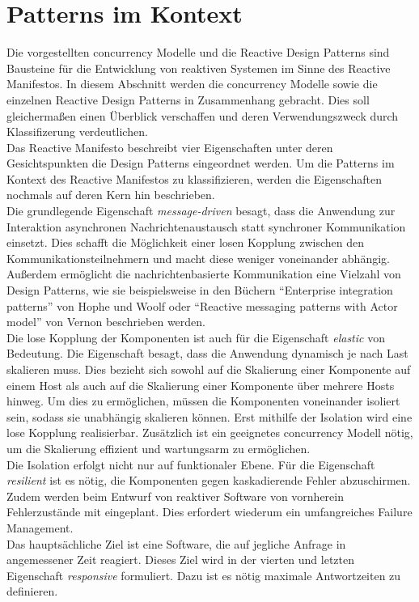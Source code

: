 \section{Patterns im Kontext}

Die vorgestellten \gls{concurrency} Modelle und die Reactive Design Patterns sind Bausteine für die Entwicklung von reaktiven Systemen im Sinne des Reactive Manifestos. In diesem Abschnitt werden die \gls{concurrency} Modelle sowie die einzelnen Reactive Design Patterns in Zusammenhang gebracht. Dies soll gleichermaßen einen Überblick verschaffen und deren Verwendungszweck durch Klassifizerung verdeutlichen.\\
Das Reactive Manifesto beschreibt vier Eigenschaften unter deren Gesichtspunkten die Design Patterns eingeordnet werden. Um die Patterns im Kontext des Reactive Manifestos zu klassifizieren, werden die Eigenschaften nochmals auf deren Kern hin beschrieben.\\

Die grundlegende Eigenschaft \textit{message-driven} besagt, dass die Anwendung zur Interaktion asynchronen Nachrichtenaustausch statt synchroner Kommunikation einsetzt. Dies schafft die Möglichkeit einer losen Kopplung zwischen den Kommunikationsteilnehmern und macht diese weniger voneinander abhängig. Außerdem ermöglicht die nachrichtenbasierte Kommunikation eine Vielzahl von Design Patterns, wie sie beispielsweise in den Büchern \enquote{Enterprise integration patterns} von Hophe und Woolf oder \enquote{Reactive messaging patterns with Actor model} von Vernon beschrieben werden.\\
Die lose Kopplung der Komponenten ist auch für die Eigenschaft \textit{elastic} von Bedeutung. Die Eigenschaft besagt, dass die Anwendung dynamisch je nach Last skalieren muss. Dies bezieht sich sowohl auf die Skalierung einer Komponente auf einem Host als auch auf die Skalierung einer Komponente über mehrere Hosts hinweg. Um dies zu ermöglichen, müssen die Komponenten voneinander isoliert sein, sodass sie unabhängig skalieren können. Erst mithilfe der Isolation wird eine lose Kopplung realisierbar. Zusätzlich ist ein geeignetes \gls{concurrency} Modell nötig, um die Skalierung effizient und wartungsarm zu ermöglichen.\\

Die Isolation erfolgt nicht nur auf funktionaler Ebene. Für die Eigenschaft \textit{resilient} ist es nötig, die Komponenten gegen kaskadierende Fehler abzuschirmen. Zudem werden beim Entwurf von reaktiver Software von vornherein Fehlerzustände mit eingeplant. Dies erfordert wiederum ein umfangreiches Failure Management.\\
Das hauptsächliche Ziel ist eine Software, die auf jegliche Anfrage in angemessener Zeit reagiert. Dieses Ziel wird in der vierten und letzten Eigenschaft \textit{responsive} formuliert. Dazu ist es nötig maximale Antwortzeiten zu definieren.\\


